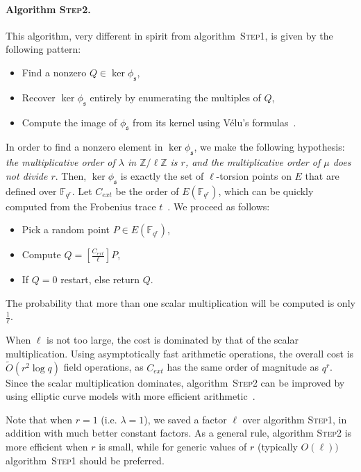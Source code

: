 \documentclass{article}
\newcommand{\F}{\mathbb{F}}
\newcommand{\Z}{\mathbb{Z}}
\newcommand{\softO}{\tilde{O}}
\newcommand{\algstyle}[1]{\textsc{#1}}
\renewcommand{\frak}{\mathfrak}
\theoremstyle{definition}
\begin{document}
\paragraph{Algorithm \algstyle{Step2}.} This algorithm, very different
in spirit from algorithm~\algstyle{Step1}, is given by the following
pattern:
\begin{itemize}
\item Find a nonzero $Q\in \ker \phi_{\frak s}$,
\item Recover $\ker \phi_{\frak s}$ entirely by enumerating the multiples of $Q$,
\item Compute the image of $\phi_{\frak s}$ from its kernel using
Vélu's formulas~\cite{todo:velu}.
\end{itemize}
In order to find a nonzero element in $\ker\phi_{\frak s}$, we make the
following hypothesis: \emph{the multiplicative order of $\lambda$ in
$\Z/\ell\Z$ is $r$, and the multiplicative order of $\mu$ does not
divide $r$}. Then, $\ker\phi_{\frak s}$ is exactly the set of $\ell$-torsion
points on $E$ that are defined over $\F_{q^r}$. Let $C_{ext}$ be the
order of $E(\F_{q^r})$, which can be quickly computed from the
Frobenius trace $t$~\cite{todo:hasseext}.
We proceed as follows:
\begin{itemize}
\item Pick a random point $P\in E(\F_{q^r})$,
\item Compute $Q = \left[\frac{C_{ext}}{\ell}\right]P$,
\item If $Q = 0$ restart, else return $Q$.
\end{itemize}
The probability that more than one scalar multiplication will be computed
is only $\frac{1}{\ell}$.

When $\ell$ is not too large, the cost is dominated by that of the scalar
multiplication. Using asymptotically fast arithmetic operations,
the overall cost is $\softO(r^2\log q)$ field operations, as $C_{ext}$
has the same order of magnitude as $q^r$. Since the scalar
multiplication dominates, algorithm~\algstyle{Step2} can be improved
by using elliptic curve models with more efficient arithmetic~\cite{todo:curvearith}.

Note that when $r = 1$
(i.e. $\lambda = 1$), we saved a factor $\ell$ over algorithm \algstyle{Step1},
in addition with much better constant factors. As a general rule,
algorithm \algstyle{Step2} is more efficient when $r$ is small, while
for generic values of $r$ (typically $O(\ell))$ algorithm~\algstyle{Step1}
should be preferred.
\end{document}
